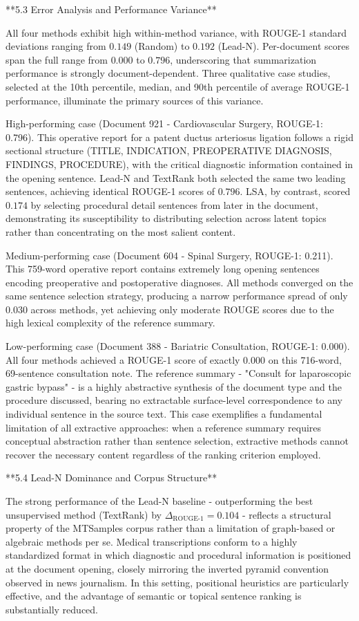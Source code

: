 \documentclass[10pt]{book}
\begin{document}
**5.3 Error Analysis and Performance Variance**

All four methods exhibit high within-method variance, with ROUGE-1 standard deviations ranging from $0.149$ (Random) to $0.192$ (Lead-N). Per-document scores span the full range from $0.000$ to $0.796$, underscoring that summarization performance is strongly document-dependent. Three qualitative case studies, selected at the 10th percentile, median, and 90th percentile of average ROUGE-1 performance, illuminate the primary sources of this variance.

High-performing case (Document 921 - Cardiovascular Surgery, ROUGE-1: 0.796). This operative report for a patent ductus arteriosus ligation follows a rigid sectional structure (TITLE, INDICATION, PREOPERATIVE DIAGNOSIS, FINDINGS, PROCEDURE), with the critical diagnostic information contained in the opening sentence. Lead-N and TextRank both selected the same two leading sentences, achieving identical ROUGE-1 scores of $0.796$. LSA, by contrast, scored $0.174$ by selecting procedural detail sentences from later in the document, demonstrating its susceptibility to distributing selection across latent topics rather than concentrating on the most salient content.

Medium-performing case (Document 604 - Spinal Surgery, ROUGE-1: 0.211). This 759-word operative report contains extremely long opening sentences encoding preoperative and postoperative diagnoses. All methods converged on the same sentence selection strategy, producing a narrow performance spread of only $0.030$ across methods, yet achieving only moderate ROUGE scores due to the high lexical complexity of the reference summary.

Low-performing case (Document 388 - Bariatric Consultation, ROUGE-1: 0.000). All four methods achieved a ROUGE-1 score of exactly $0.000$ on this 716-word, 69-sentence consultation note. The reference summary - "Consult for laparoscopic gastric bypass" - is a highly abstractive synthesis of the document type and the procedure discussed, bearing no extractable surface-level correspondence to any individual sentence in the source text. This case exemplifies a fundamental limitation of all extractive approaches: when a reference summary requires conceptual abstraction rather than sentence selection, extractive methods cannot recover the necessary content regardless of the ranking criterion employed.

**5.4 Lead-N Dominance and Corpus Structure**

The strong performance of the Lead-N baseline - outperforming the best unsupervised method (TextRank) by $\Delta_{\text{ROUGE-1}} = 0.104$ - reflects a structural property of the MTSamples corpus rather than a limitation of graph-based or algebraic methods per se. Medical transcriptions conform to a highly standardized format in which diagnostic and procedural information is positioned at the document opening, closely mirroring the inverted pyramid convention observed in news journalism. In this setting, positional heuristics are particularly effective, and the advantage of semantic or topical sentence ranking is substantially reduced.
\end{document}
